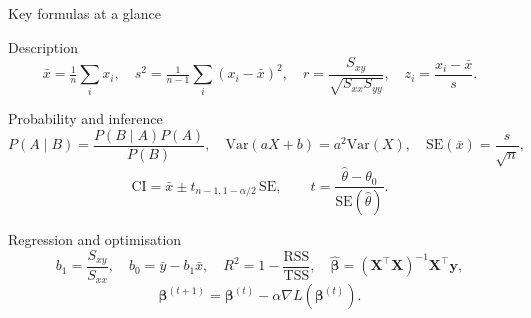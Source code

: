 \documentclass[aspectratio=169,11pt]{beamer}
\begin{document}
\begin{frame}{Key formulas at a glance}
  \footnotesize
  \begin{block}{Description}
    \[
      \bar x = \tfrac1n\textstyle\sum_i x_i,
      \quad
      s^2 = \tfrac{1}{n-1}\textstyle\sum_i (x_i-\bar x)^2,
      \quad
      r = \frac{S_{xy}}{\sqrt{S_{xx}S_{yy}}},
      \quad
      z_i = \frac{x_i-\bar x}{s}.
    \]
  \end{block}
  \begin{block}{Probability and inference}
    \[
      P(A\mid B) = \frac{P(B\mid A)P(A)}{P(B)},
      \quad
      \mathrm{Var}(aX+b) = a^2\mathrm{Var}(X),
      \quad
      \mathrm{SE}(\bar x) = \frac{s}{\sqrt n},
    \]
    \[
      \text{CI} = \bar x \pm t_{n-1,1-\alpha/2}\,\mathrm{SE},
      \qquad
      t = \frac{\hat\theta - \theta_0}{\mathrm{SE}(\hat\theta)} .
    \]
  \end{block}
  \begin{block}{Regression and optimisation}
    \[
      b_1 = \frac{S_{xy}}{S_{xx}}, \quad b_0 = \bar y - b_1\bar x,
      \quad
      R^2 = 1 - \frac{\mathrm{RSS}}{\mathrm{TSS}},
      \quad
      \hat{\boldsymbol\beta} = (\mathbf{X}^\top\mathbf{X})^{-1}\mathbf{X}^\top\mathbf{y},
    \]
    \[
      \boldsymbol\beta^{(t+1)} = \boldsymbol\beta^{(t)} - \alpha\nabla L(\boldsymbol\beta^{(t)}) .
    \]
  \end{block}
\end{frame}
\end{document}
